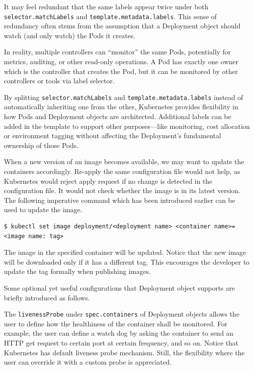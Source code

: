 \begin{shortbox}

It may feel redundant that the same labels appear twice under both \texttt{selector.matchLabels} and \texttt{template.metadata.labels}. This sense of redundancy often stems from the assumption that a Deployment object should watch (and only watch) the Pods it creates.

In reality, multiple controllers can ``monitor'' the same Pods, potentially for metrics, auditing, or other read-only operations. A Pod has exactly one owner which is the controller that creates the Pod, but it can be monitored by other controllers or tools via label selector.

By splitting \texttt{selector.matchLabels} and \texttt{template.metadata.labels} instead of automatically inheriting one from the other, Kubernetes provides flexibility in how Pods and Deployment objects are architected. Additional labels can be added in the template to support other purposes—like monitoring, cost allocation or environment tagging without affecting the Deployment’s fundamental ownership of those Pods.

\end{shortbox}

When a new version of an image becomes available, we may want to update the containers accordingly. Re-apply the same configuration file would not help, as Kubernetes would reject apply request if no change is detected in the configuration file. It would not check whether the image is in its latest version. The following imperative command which has been introduced earlier can be used to update the image.
\begin{lstlisting}
$ kubectl set image deployment/<deployment name> <container name>=<image name: tag>
\end{lstlisting}
The image in the specified container will be updated. Notice that the new image will be downloaded only if it has a different tag. This encourages the developer to update the tag formally when publishing images.

Some optional yet useful configurations that Deployment object supports are briefly introduced as follows.

The \verb|livenessProbe| under \verb|spec.containers| of Deployment objects allows the user to define how the healthiness of the container shall be monitored. For example, the user can define a watch dog by asking the container to send an HTTP get request to certain port at certain frequency, and so on. Notice that Kubernetes has default liveness probe mechanism. Still, the flexibility where the user can override it with a custom probe is appreciated.

